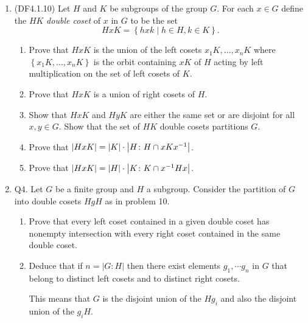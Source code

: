 \documentclass[11pt]{article}
\newcommand{\cbr}[1]{\left\{#1\right\}}
\begin{document}
\begin{enumerate}
    \item (DF4.1.10) Let $H$ and $K$ be subgroups of the group $G$. For each $x\in G$ define the $HK$ \textit{double coset} of $x$ in $G$ to be the set \[HxK = \cbr{hxk \mid h\in H,k\in K}.\]
    \begin{enumerate}[label=\textbf{(\alph*)}]
        \item Prove that $HxK$ is the union of the left cosets $x_1K,\dots,x_nK$ where $\cbr{x_1K,\dots,x_nK}$ is the orbit containing $xK$ of $H$ acting by left multiplication on the set of left cosets of $K$.
        \item Prove that $HxK$ is a union of right cosets of $H$.
        \item Show that $HxK$ and $HyK$ are either the same set or are disjoint for all $x,y\in G$. Show that the set of $HK$ double cosets partitions $G$.
        \item Prove that $\abs{HxK} = \abs{K}\cdot \abs{H\colon H\cap xKx^{-1}}$.
        \item Prove that $\abs{HxK} = \abs{H}\cdot \abs{K\colon K\cap x^{-1}Hx}$.
    \end{enumerate}
    \item Q4. Let $G$ be a finite group and $H$ a subgroup. Consider the partition of $G$ into double cosets $HgH$  as in problem 10.
    \begin{enumerate}[label=\textbf{(\alph*)}]
        \item Prove that every left coset contained in a given double coset has nonempty intersection with every right coset contained in the same double coset.
        \item Deduce that if $n=|G:H|$ then there exist  elements $g_1,\cdots g_n$ in $G$ that belong to distinct left cosets and to distinct right cosets.
    
        This means that $G$ is the disjoint union of the $Hg_i$ and also the disjoint union of the $g_iH$.
    \end{enumerate}
\end{enumerate}
\end{document}
